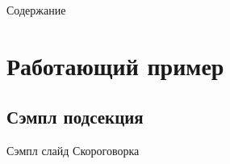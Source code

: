 \documentclass[12pt,aspectratio=169,svgnames]{beamer}
\begin{document}
 \maketitle

\begin{frame}{Содержание}
	\tableofcontents
\end{frame}

\section{Работающий пример}

\subsection{Сэмпл подсекция}

\begin{frame}{Сэмпл слайд}
	Скороговорка
\end{frame}
\end{document}
